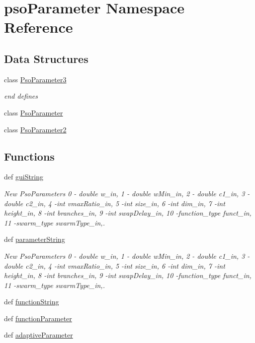 \hypertarget{namespacepsoParameter}{
\section{psoParameter Namespace Reference}
\label{namespacepsoParameter}
}


\subsection*{Data Structures}
\begin{CompactItemize}
\item 
class \hyperlink{classpsoParameter_1_1PsoParameter3}{PsoParameter3}
\begin{CompactList}\small\item\em end defines \item\end{CompactList}\item 
class \hyperlink{classpsoParameter_1_1PsoParameter}{PsoParameter}
\item 
class \hyperlink{classpsoParameter_1_1PsoParameter2}{PsoParameter2}
\end{CompactItemize}
\subsection*{Functions}
\begin{CompactItemize}
\item 
def \hyperlink{namespacepsoParameter_6c78a7e22e06e343ef022270b3bd4a6a}{guiString}
\begin{CompactList}\small\item\em New PsoParameters 0 - double w\_\-in, 1 - double wMin\_\-in, 2 - double c1\_\-in, 3 - double c2\_\-in, 4 -int vmaxRatio\_\-in, 5 -int size\_\-in, 6 -int dim\_\-in, 7 -int height\_\-in, 8 -int branches\_\-in, 9 -int swapDelay\_\-in, 10 -function\_\-type funct\_\-in, 11 -swarm\_\-type swarmType\_\-in,. \item\end{CompactList}\item 
def \hyperlink{namespacepsoParameter_dbef2f523ebe62d1af2acaccdce72994}{parameterString}
\begin{CompactList}\small\item\em New PsoParameters 0 - double w\_\-in, 1 - double wMin\_\-in, 2 - double c1\_\-in, 3 - double c2\_\-in, 4 -int vmaxRatio\_\-in, 5 -int size\_\-in, 6 -int dim\_\-in, 7 -int height\_\-in, 8 -int branches\_\-in, 9 -int swapDelay\_\-in, 10 -function\_\-type funct\_\-in, 11 -swarm\_\-type swarmType\_\-in,. \item\end{CompactList}\item 
def \hyperlink{namespacepsoParameter_dbc3bc0037c2e5d516ea512cfd3ab2a0}{functionString}
\item 
def \hyperlink{namespacepsoParameter_5cb9e79fe67a1c2c627152daf9a22d2c}{functionParameter}
\item 
def \hyperlink{namespacepsoParameter_8d728ee2ab1bff9769b404756151dcfd}{adaptiveParameter}
\end{CompactItemize}
